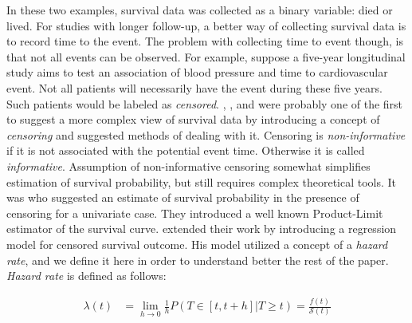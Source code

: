 \documentclass[]{article}
\begin{document}
In these two examples, survival data was collected as a binary variable: died or lived. For studies with longer follow-up, a better way of collecting survival data is to record time to the event. The problem with collecting time to event though, is that not all events can be observed. For example, suppose a five-year longitudinal study aims to test an association of blood pressure and time to cardiovascular event. Not all patients will necessarily have the event during these five years. Such patients would be labeled as \emph{censored}.  \cite{fisher1931truncated},  \cite{hald1949maximum}, and \cite{swan1969computing} were probably one of the first to suggest a more complex view of survival data by introducing a concept of \emph{censoring} and suggested methods of dealing with it. Censoring is \emph{non-informative} if it is not associated with the potential event time. Otherwise it is called \emph{informative}. Assumption of non-informative censoring somewhat simplifies estimation of survival probability, but still requires complex theoretical tools. It was \cite{kaplan1958nonparametric} who suggested an estimate of survival probability in the presence of censoring for a univariate case. They introduced a well known Product-Limit estimator of the survival curve. \cite{david1972regression} extended their work by introducing a regression model for censored survival outcome. His model utilized a concept of a \emph{hazard rate}, and we define it here in order to understand better the rest of the paper. \emph{Hazard rate} is defined as follows:

$$
\begin{aligned}
	\lambda(t) &= \lim_{h\rightarrow 0} \frac{1}{h} P(T\in[t,t+h] | T\geq t)=
	             \frac{f(t)}{\mathcal{S}(t)}
\end{aligned}
$$
\end{document}
